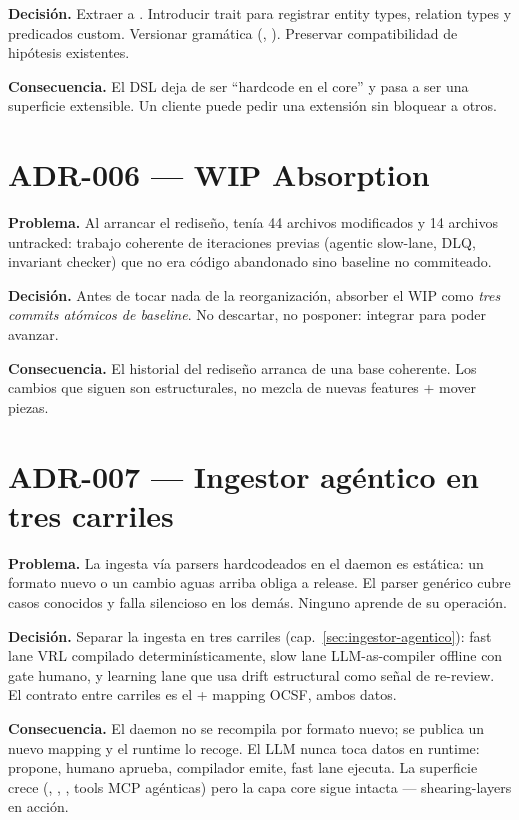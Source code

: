 \textbf{Decisión.} Extraer a . Introducir
 trait para registrar entity types, relation
types y predicados custom. Versionar gramática (,
). Preservar compatibilidad de hipótesis
existentes.

\textbf{Consecuencia.} El DSL deja de ser ``hardcode en el core'' y
pasa a ser una superficie extensible. Un cliente puede pedir una
extensión sin bloquear a otros.

\section{ADR-006 — WIP Absorption}

\textbf{Problema.} Al arrancar el rediseño,  tenía
44 archivos modificados y 14 archivos untracked: trabajo coherente
de iteraciones previas (agentic slow-lane, DLQ, invariant checker)
que no era código abandonado sino baseline no commiteado.

\textbf{Decisión.} Antes de tocar nada de la reorganización,
absorber el WIP como \emph{tres commits atómicos de baseline}. No
descartar, no posponer: integrar para poder avanzar.

\textbf{Consecuencia.} El historial del rediseño arranca de una
base coherente. Los cambios que siguen son estructurales, no
mezcla de nuevas features + mover piezas.

\section{ADR-007 — Ingestor agéntico en tres carriles}

\textbf{Problema.} La ingesta vía parsers hardcodeados en el
daemon es estática: un formato nuevo o un cambio aguas arriba
obliga a release. El parser genérico cubre casos conocidos y falla
silencioso en los demás. Ninguno aprende de su operación.

\textbf{Decisión.} Separar la ingesta en tres carriles
(cap.~\ref{sec:ingestor-agentico}): fast lane VRL compilado
determinísticamente, slow lane LLM-as-compiler offline con gate
humano, y learning lane que usa drift estructural como señal de
re-review. El contrato entre carriles es el  +
mapping OCSF, ambos datos.

\textbf{Consecuencia.} El daemon no se recompila por formato
nuevo; se publica un nuevo mapping y el runtime lo recoge. El LLM
nunca toca datos en runtime: propone, humano aprueba, compilador
emite, fast lane ejecuta. La superficie crece
(, ,
, tools MCP agénticas) pero la capa
core sigue intacta — shearing-layers en acción.

